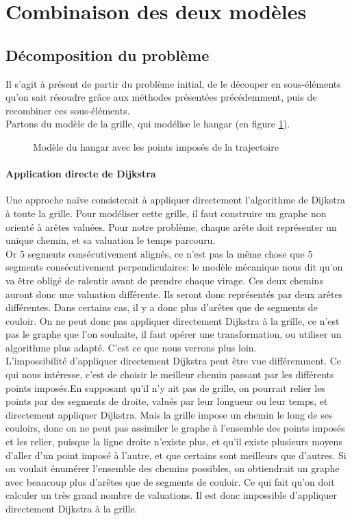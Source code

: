 \section{Combinaison des deux modèles}
\subsection{Décomposition du problème}
Il s'agit à présent de partir du problème initial, de le découper en sous-éléments qu'on sait résoudre grâce aux méthodes présentées précédemment, puis de recombiner ces sous-éléments.\\
Partons du modèle de la grille, qui modélise le hangar (en figure \ref{fig:grille1}).\\
\begin{figure}[h]
	\centering
	
	\caption{Modèle du hangar avec les points imposés de la trajectoire}
	\label{fig:grille1}
\end{figure}
\paragraph{Application directe de Dijkstra}Une approche naïve consisterait à appliquer directement l'algorithme de Dijkstra à toute la grille. Pour modéliser cette grille, il faut construire un graphe non orienté à arêtes valuées. Pour notre problème, chaque arête doit représenter un unique chemin, et sa valuation le temps parcouru.\\
Or 5 segments consécutivement alignés, ce n'est pas la même chose que 5 segments consécutivement perpendiculaires: le modèle mécanique nous dit qu'on va être obligé de ralentir avant de prendre chaque virage. Ces deux chemins auront donc une valuation différente. Ils seront donc représentés par deux arêtes différentes. Dans certains cas, il y a donc plus d'arêtes que de segments de couloir. On ne peut donc pas appliquer directement Dijkstra à la grille, ce n'est pas le graphe que l'on souhaite, il faut opérer une transformation, ou utiliser un algorithme plus adapté. C'est ce que nous verrons plus loin.\\
L'impossibilité d'appliquer directement Dijkstra peut être vue différemment. Ce qui nous intéresse, c'est de choisir le meilleur chemin passant par les différents points imposés.En supposant qu'il n'y ait pas de grille, on pourrait relier les points par des segments de droite, valués par leur longueur ou leur temps, et directement appliquer Dijkstra. Mais la grille impose un chemin le long de ses couloirs, donc on ne peut pas assimiler le graphe à l'ensemble des points imposés et les relier, puisque la ligne droite n'existe plus, et qu'il existe plusieurs moyens d'aller d'un point imposé à l'autre, et que certains sont meilleurs que d'autres. Si on voulait énumérer l'ensemble des chemins possibles, on obtiendrait un graphe avec beaucoup plus d'arêtes que de segments de couloir. Ce qui fait qu'on doit calculer un très grand nombre de valuations. Il est donc impossible d'appliquer directement Dijkstra à la grille.

